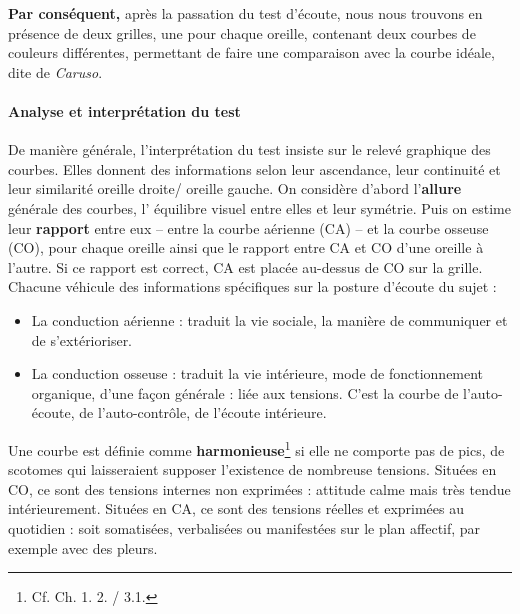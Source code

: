  \textbf{Par conséquent,} après la passation du test d\textquoteright écoute, nous nous
trouvons en présence de deux grilles, une  pour chaque oreille, contenant deux courbes
de couleurs différentes, permettant de faire une comparaison avec la courbe
 idéale, dite de \textit{Caruso}.

  
  
  
  

\paragraph{Analyse et interprétation du test}
De manière générale, l'interprétation du test insiste sur le relevé graphique
des
courbes. Elles donnent des informations selon leur ascendance, leur
continuité et leur similarité oreille droite/ oreille gauche.
On considère d'abord l'\textbf{allure }générale des courbes,
 l' équilibre visuel entre elles et leur symétrie.
Puis on estime
leur\textbf{ rapport} entre eux -- entre la courbe aérienne (CA) -- et la courbe osseuse (CO),
pour chaque oreille ainsi que le rapport entre CA et CO d\textquoteright une
oreille à l'autre. Si ce rapport est correct, CA est placée au-dessus
de CO sur la grille.
Chacune  véhicule des informations spécifiques
sur la posture d'écoute du sujet :
\begin{itemize}
\item La conduction aérienne : traduit la vie sociale, la manière de communiquer
et de s'extérioriser.
\item La conduction osseuse : traduit la vie intérieure, mode de fonctionnement
organique, d'une façon générale : liée aux tensions. C'est la courbe
de l\textquoteright auto-écoute, de l\textquoteright auto-contrôle,
de l'écoute intérieure.
\end{itemize}

Une courbe est définie comme \textbf{harmonieuse}\footnote{Cf. Ch. 1. 2. / 3.1.}
si elle ne comporte pas de
pics, de scotomes
qui laisseraient
supposer l'existence de nombreuse tensions.
Situées en CO, ce sont des tensions internes non exprimées : attitude
calme mais très tendue intérieurement.
Situées en CA, ce sont des tensions réelles et exprimées au quotidien
: soit somatisées, verbalisées ou manifestées sur le plan
affectif, par exemple avec des pleurs.

